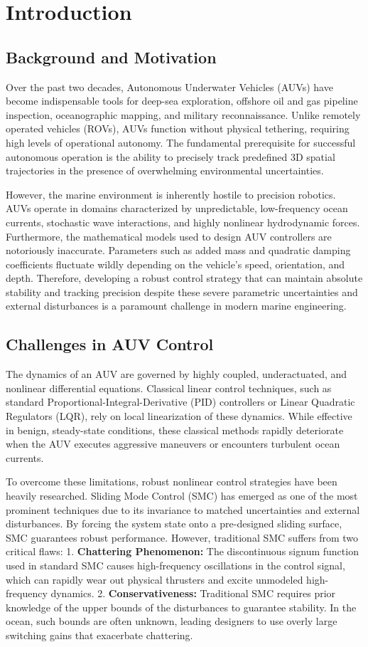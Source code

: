 \documentclass[conference]{IEEEtran}
\begin{document}
\section{Introduction}
\subsection{Background and Motivation}
Over the past two decades, Autonomous Underwater Vehicles (AUVs) have become indispensable tools for deep-sea exploration, offshore oil and gas pipeline inspection, oceanographic mapping, and military reconnaissance. Unlike remotely operated vehicles (ROVs), AUVs function without physical tethering, requiring high levels of operational autonomy. The fundamental prerequisite for successful autonomous operation is the ability to precisely track predefined 3D spatial trajectories in the presence of overwhelming environmental uncertainties. 

However, the marine environment is inherently hostile to precision robotics. AUVs operate in domains characterized by unpredictable, low-frequency ocean currents, stochastic wave interactions, and highly nonlinear hydrodynamic forces. Furthermore, the mathematical models used to design AUV controllers are notoriously inaccurate. Parameters such as added mass and quadratic damping coefficients fluctuate wildly depending on the vehicle's speed, orientation, and depth. Therefore, developing a robust control strategy that can maintain absolute stability and tracking precision despite these severe parametric uncertainties and external disturbances is a paramount challenge in modern marine engineering.

\subsection{Challenges in AUV Control}
The dynamics of an AUV are governed by highly coupled, underactuated, and nonlinear differential equations. Classical linear control techniques, such as standard Proportional-Integral-Derivative (PID) controllers or Linear Quadratic Regulators (LQR), rely on local linearization of these dynamics. While effective in benign, steady-state conditions, these classical methods rapidly deteriorate when the AUV executes aggressive maneuvers or encounters turbulent ocean currents. 

To overcome these limitations, robust nonlinear control strategies have been heavily researched. Sliding Mode Control (SMC) has emerged as one of the most prominent techniques due to its invariance to matched uncertainties and external disturbances. By forcing the system state onto a pre-designed sliding surface, SMC guarantees robust performance. However, traditional SMC suffers from two critical flaws:
1. \textbf{Chattering Phenomenon:} The discontinuous signum function used in standard SMC causes high-frequency oscillations in the control signal, which can rapidly wear out physical thrusters and excite unmodeled high-frequency dynamics.
2. \textbf{Conservativeness:} Traditional SMC requires prior knowledge of the upper bounds of the disturbances to guarantee stability. In the ocean, such bounds are often unknown, leading designers to use overly large switching gains that exacerbate chattering.
\end{document}

